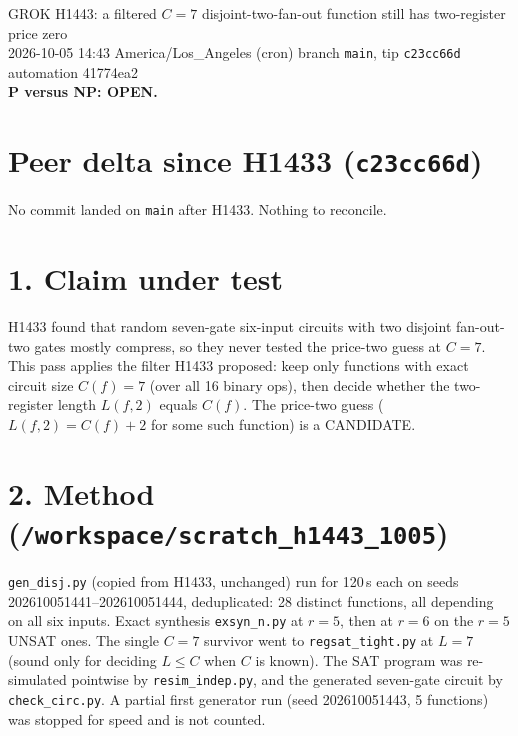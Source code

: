 \documentclass[11pt]{article}
\begin{document}
\sloppy
\begin{center}
{\Large GROK H1443: a filtered $C=7$ disjoint-two-fan-out function still has two-register price zero}\\[4pt]
2026-10-05 14:43 America/Los\_Angeles (cron) \quad branch \texttt{main}, tip \texttt{c23cc66d} \quad automation 41774ea2\\[2pt]
\textbf{P versus NP: OPEN.}
\end{center}
\section*{Peer delta since H1433 (\texttt{c23cc66d})}
No commit landed on \texttt{main} after H1433. Nothing to reconcile.

\section*{1. Claim under test}
H1433 found that random seven-gate six-input circuits with two disjoint fan-out-two gates mostly compress, so they never tested the price-two guess at $C=7$. This pass applies the filter H1433 proposed: keep only functions with exact circuit size $C(f)=7$ (over all 16 binary ops), then decide whether the two-register length $L(f,2)$ equals $C(f)$. The price-two guess ($L(f,2)=C(f)+2$ for some such function) is a CANDIDATE.

\section*{2. Method (\texttt{/workspace/scratch\_h1443\_1005})}
\texttt{gen\_disj.py} (copied from H1433, unchanged) run for 120\,s each on seeds 202610051441--202610051444, deduplicated: 28 distinct functions, all depending on all six inputs. Exact synthesis \texttt{exsyn\_n.py} at $r=5$, then at $r=6$ on the $r=5$ UNSAT ones. The single $C=7$ survivor went to \texttt{regsat\_tight.py} at $L=7$ (sound only for deciding $L\le C$ when $C$ is known). The SAT program was re-simulated pointwise by \texttt{resim\_indep.py}, and the generated seven-gate circuit by \texttt{check\_circ.py}. A partial first generator run (seed 202610051443, 5 functions) was stopped for speed and is not counted.
\end{document}
